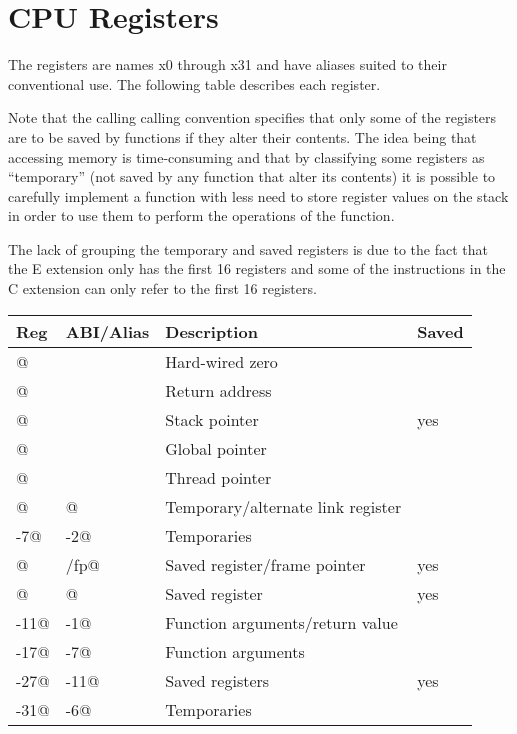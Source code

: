 

\section{CPU Registers}
\label{cpuregs}

The registers are names x0 through x31 and have aliases suited to their 
conventional use.  The following table describes each register.  

Note 
that the calling calling convention specifies that only some 
of the registers are to be saved by functions if they alter their contents.
The idea being that accessing memory is time-consuming and that by
classifying some registers as ``temporary'' (not saved by any function
that alter its contents) it is possible to carefully implement a function
with less need to store register values on the stack in order to use them
to perform the operations of the function.

The lack of grouping the temporary and saved registers is due to the
fact that the E extension %
only has the first 16 registers
and some of the instructions in the C extension %
can only refer to the first 16 registers.


\begin{center}
\begin{tabular}{|l|l|l|l|}
\hline
Reg		& ABI/Alias	& Description						& Saved		\\
\hline
\hline
\verb@x0@		&	\verb@zero@		& Hard-wired zero					&			\\
\verb@x1@		&	\verb@ra@		& Return address					& 			\\
\verb@x2@		&	\verb@sp@		& Stack pointer						& yes		\\
\verb@x3@		&	\verb@gp@		& Global pointer					&			\\
\verb@x4@		&	\verb@tp@		& Thread pointer					&			\\
\verb@x5@		&	\verb@t0@		& Temporary/alternate link register	&			\\
\verb@x6-7@		&	\verb@t1-2@		& Temporaries						&			\\
\verb@x8@		&	\verb@s0/fp@	& Saved register/frame pointer		& yes		\\
\verb@x9@		&	\verb@s1@		& Saved register					& yes		\\
\verb@x10-11@	&	\verb@a0-1@		& Function arguments/return value	& 			\\
\verb@x12-17@	&	\verb@a2-7@		& Function arguments				& 			\\
\verb@x18-27@	&	\verb@s2-11@	& Saved registers					& yes		\\
\verb@x28-31@	&	\verb@t3-6@		& Temporaries						&			\\
\hline
\end{tabular}
\end{center}



